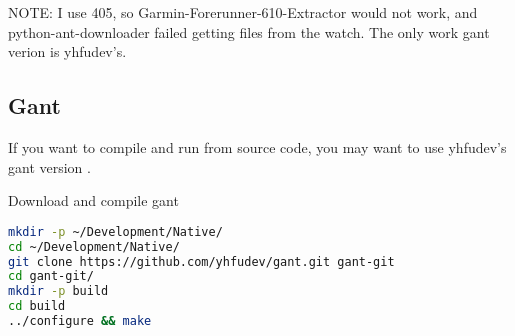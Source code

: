 \documentclass[letter,12pt,onecolumn]{article}
\newcommand\comments[1]{#1}
\renewcommand\comments[1]{}
\newcommand{\cnt}[3]{{#1}{#2}{#3}}
\renewcommand{\cnt}[3]{#2}
\renewcommand{\cnt}[3]{#3}
\renewcommand{\cnt}[3]{#1}
\begin{document}
\cnt{NOTE: I use 405, so {Garmin-Forerunner-610-Extractor} would not work, and {python-ant-downloader} failed getting files from the watch.}
    {注意，我是使用 405 测试的，所以 {Garmin-Forerunner-610-Extractor} 和 {python-ant-downloader} 都没有测试成功。}
    {注意，我是使用 405 測試的，所以 {Garmin-Forerunner-610-Extractor} 和 {python-ant-downloader} 都沒有測試成功。}
\cnt{The only work gant verion is yhfudev's.}
    {而Gant的几个版本中，只有 yhfudev 的 Gant 版本 \cite{gant405} 可以成功获取文件。}
    {而Gant的幾個版本中，只有 yhfudev 的 Gant 版本 \cite{gant405} 可以成功獲取文件。}

\subsection{\cnt{Gant}{使用 Gant}{使用 Gant}}
\comments{
\cnt{You may install the gant for your Debian Linux:}{可以直接在debian下安装:}{可以直接在debian下安裝:}
\begin{lstlisting}[language=bash]
sudo apt-get install -y garmin-ant-downloader
\end{lstlisting}
}

\cnt{If you want to compile and run from source code, you may want to use yhfudev's gant version \cite{gant405}.}
    {如果是选择源代码编译安装，可以选择 yhfudev 的 gant 版本 \cite{gant405}。}
    {如果是選擇源代碼編譯安裝，可以選擇 yhfudev 的 gant 版本 \cite{gant405}。}

\cnt{Download and compile gant}{下载编译：}{下載編譯：}
\begin{lstlisting}[language=bash]
mkdir -p ~/Development/Native/
cd ~/Development/Native/
git clone https://github.com/yhfudev/gant.git gant-git
cd gant-git/
mkdir -p build
cd build
../configure && make
\end{lstlisting}
\end{document}
